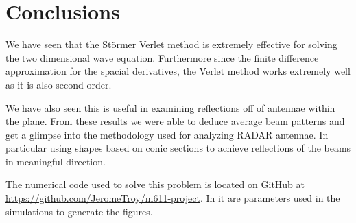 \documentclass{article}
\begin{document}
\section{Conclusions}

We have seen that the St\"ormer Verlet method is extremely effective for
solving the two dimensional wave equation.  Furthermore since the
finite difference approximation for the spacial derivatives, the Verlet method
works extremely well as it is also second order.

We have also seen this is
useful in examining reflections off of antennae within the plane.
From these results we were able to deduce average beam patterns and get a
glimpse into the methodology used for analyzing RADAR antennae.  In particular
using shapes based on conic sections to achieve reflections of the beams
in meaningful direction.

\newpage

\nocite{class-book}



The numerical code used to solve this problem is located on GitHub at
\url{https://github.com/JeromeTroy/m611-project}.
In it are parameters used in the simulations to generate the figures.
\end{document}

